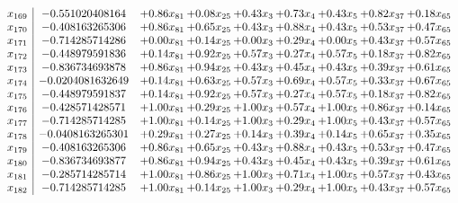 \documentclass[8pt]{article}
\begin{document}
\[\begin{array}{c| c c@{\hskip 2pt} c@{\hskip 2pt} c@{\hskip 2pt} c@{\hskip 2pt} c@{\hskip 2pt} c@{\hskip 2pt} c@{\hskip 2pt} }
 x_{169}   &  -0.551020408164 & +  0.86 x_{81} & +  0.08 x_{25} & +  0.43 x_{3} & +  0.73 x_{4} & +  0.43 x_{5} & +  0.82 x_{37} & +  0.18 x_{65}\\
 x_{170}   &  -0.408163265306 & +  0.86 x_{81} & +  0.65 x_{25} & +  0.43 x_{3} & +  0.88 x_{4} & +  0.43 x_{5} & +  0.53 x_{37} & +  0.47 x_{65}\\
 x_{171}   &  -0.714285714286 & +  0.00 x_{81} & +  0.14 x_{25} & +  0.00 x_{3} & +  0.29 x_{4} & +  0.00 x_{5} & +  0.43 x_{37} & +  0.57 x_{65}\\
 x_{172}   &  -0.448979591836 & +  0.14 x_{81} & +  0.92 x_{25} & +  0.57 x_{3} & +  0.27 x_{4} & +  0.57 x_{5} & +  0.18 x_{37} & +  0.82 x_{65}\\
 x_{173}   &  -0.836734693878 & +  0.86 x_{81} & +  0.94 x_{25} & +  0.43 x_{3} & +  0.45 x_{4} & +  0.43 x_{5} & +  0.39 x_{37} & +  0.61 x_{65}\\
 x_{174}   &  -0.0204081632649 & +  0.14 x_{81} & +  0.63 x_{25} & +  0.57 x_{3} & +  0.69 x_{4} & +  0.57 x_{5} & +  0.33 x_{37} & +  0.67 x_{65}\\
 x_{175}   &  -0.448979591837 & +  0.14 x_{81} & +  0.92 x_{25} & +  0.57 x_{3} & +  0.27 x_{4} & +  0.57 x_{5} & +  0.18 x_{37} & +  0.82 x_{65}\\
 x_{176}   &  -0.428571428571 & +  1.00 x_{81} & +  0.29 x_{25} & +  1.00 x_{3} & +  0.57 x_{4} & +  1.00 x_{5} & +  0.86 x_{37} & +  0.14 x_{65}\\
 x_{177}   &  -0.714285714285 & +  1.00 x_{81} & +  0.14 x_{25} & +  1.00 x_{3} & +  0.29 x_{4} & +  1.00 x_{5} & +  0.43 x_{37} & +  0.57 x_{65}\\
 x_{178}   &  -0.0408163265301 & +  0.29 x_{81} & +  0.27 x_{25} & +  0.14 x_{3} & +  0.39 x_{4} & +  0.14 x_{5} & +  0.65 x_{37} & +  0.35 x_{65}\\
 x_{179}   &  -0.408163265306 & +  0.86 x_{81} & +  0.65 x_{25} & +  0.43 x_{3} & +  0.88 x_{4} & +  0.43 x_{5} & +  0.53 x_{37} & +  0.47 x_{65}\\
 x_{180}   &  -0.836734693877 & +  0.86 x_{81} & +  0.94 x_{25} & +  0.43 x_{3} & +  0.45 x_{4} & +  0.43 x_{5} & +  0.39 x_{37} & +  0.61 x_{65}\\
 x_{181}   &  -0.285714285714 & +  1.00 x_{81} & +  0.86 x_{25} & +  1.00 x_{3} & +  0.71 x_{4} & +  1.00 x_{5} & +  0.57 x_{37} & +  0.43 x_{65}\\
 x_{182}   &  -0.714285714285 & +  1.00 x_{81} & +  0.14 x_{25} & +  1.00 x_{3} & +  0.29 x_{4} & +  1.00 x_{5} & +  0.43 x_{37} & +  0.57 x_{65}\\

\end{array}\]
\end{document}
